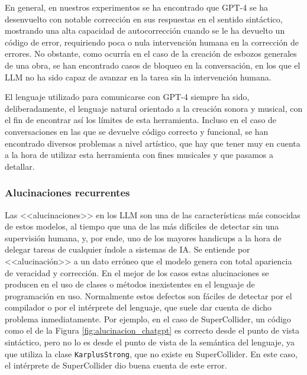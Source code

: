 En general, en nuestros experimentos se ha encontrado que GPT-4 se ha desenvuelto con notable corrección en sus respuestas en el sentido sintáctico, mostrando una alta capacidad de autocorrección cuando se le ha devuelto un código de error, requiriendo poca o nula intervención humana en la corrección de errores. No obstante, como ocurría en el caso de la creación de esbozos generales de una obra, se han encontrado casos de bloqueo en la conversación, en los que el LLM no ha sido capaz de avanzar en la tarea sin la intervención humana. 

El lenguaje utilizado para comunicarse con GPT-4 siempre ha sido, deliberadamente, el lenguaje natural orientado a la creación sonora y musical, con el fin de encontrar así los límites de esta herramienta. Incluso en el caso de conversaciones en las que se devuelve código correcto y funcional, se han encontrado diversos problemas a nivel artístico, que hay que tener muy en cuenta a la hora de utilizar esta herramienta con fines musicales y que pasamos a detallar.


\subsubsection{Alucinaciones recurrentes}
Las <<alucinaciones>> en los LLM son una de las características más conocidas de estos modelos, al tiempo que una de las más difíciles de detectar sin una supervisión humana, y, por ende, uno de los mayores handicups a la hora de delegar tareas de cualquier índole a sistemas de IA. Se entiende por <<alucinación>> a un dato erróneo que el modelo genera con total apariencia de veracidad y corrección. En el mejor de los casos estas alucinaciones se producen en el uso de clases o métodos inexistentes en el lenguaje de programación en uso. Normalmente estos defectos son fáciles de detectar por el compilador o por el intérprete del lenguaje, que suele dar cuenta de dicho problema inmediatamente. Por ejemplo, en el caso de SuperCollider, un código como el de la Figura \ref{fig:alucinacion_chatgpt} es correcto desde el punto de vista sintáctico, pero no lo es desde el punto de vista de la semántica del lenguaje, ya que utiliza la clase \texttt{KarplusStrong}, que no existe en SuperCollider. En este caso, el intérprete de SuperCollider dio buena cuenta de este error. 

